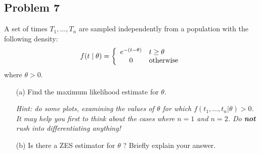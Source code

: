 \documentclass{article}
\newcommand{\1}{\mathbf{1}}
\begin{document}
\subsection*{Problem 7}
A set of  times $T_1,\ldots ,T_n$ are sampled independently from a population with the following density:
$$f(t \mid \theta)  = \left\{\begin{array}{cl}
    e^{-(t-\theta)} & t \geq \theta \\
    0 & \hbox{otherwise}
    \end{array}\right.
$$
where $\theta >0$. \par
\begin{itemize}
    \item[(a)] Find the maximum likelihood estimate for $\theta$.\par
    {\it Hint: do some plots, examining the values of $\theta$ for which $f(t_1,\ldots,t_n|\theta)>0$. It may help you first to think about the cases where $n=1$ and $n=2$.  Do {\bf not}  rush into differentiating anything!}
    \item[(b)] Is there a ZES estimator for $\theta$ ? Briefly explain your answer.
\end{itemize}

\end{document}
